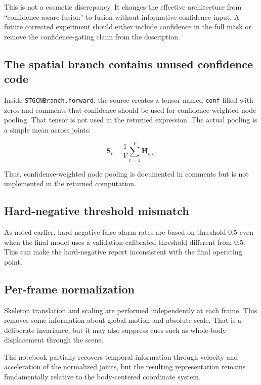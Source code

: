\documentclass[11pt,a4paper]{article}
\newcommand{\code}[1]{\texttt{#1}}
\begin{document}
This is not a cosmetic discrepancy. It changes the effective architecture from ``confidence-aware fusion'' to fusion without informative confidence input. A future corrected experiment should either include confidence in the full mask or remove the confidence-gating claim from the description.

\subsection{The spatial branch contains unused confidence code}

Inside \code{STGCNBranch.forward}, the source creates a tensor named \code{conf} filled with zeros and comments that confidence should be used for confidence-weighted node pooling. That tensor is not used in the returned expression. The actual pooling is a simple mean across joints:

\begin{equation}
\mathbf{S}_{t}
=
\frac{1}{V}
\sum_{v=1}^{V}
\mathbf{H}_{t,v}.
\end{equation}

Thus, confidence-weighted node pooling is documented in comments but is not implemented in the returned computation.

\subsection{Hard-negative threshold mismatch}

As noted earlier, hard-negative false-alarm rates are based on threshold $0.5$ even when the final model uses a validation-calibrated threshold different from $0.5$. This can make the hard-negative report inconsistent with the final operating point.

\subsection{Per-frame normalization}

Skeleton translation and scaling are performed independently at each frame. This removes some information about global motion and absolute scale. That is a deliberate invariance, but it may also suppress cues such as whole-body displacement through the scene.

The notebook partially recovers temporal information through velocity and acceleration of the normalized joints, but the resulting representation remains fundamentally relative to the body-centered coordinate system.
\end{document}
